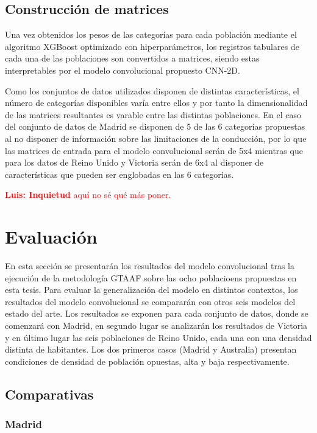 \documentclass{uathesis-es}
\begin{document}
{\subsection{Construcción de matrices}

Una vez obtenidos los pesos de las categorías para cada población mediante el algoritmo XGBoost optimizado con hiperparámetros, los registros tabulares de cada una de las poblaciones son convertidos a matrices, siendo estas interpretables por el modelo convolucional propuesto CNN-2D.

Como los conjuntos de datos utilizados disponen de distintas características, el número de categorías disponibles varía entre ellos y por tanto la dimensionalidad de las matrices resultantes es varable entre las distintas poblaciones. En el caso del conjunto de datos de Madrid se disponen de 5 de las 6 categorías propuestas al no disponer de información sobre las limitaciones de la conducción, por lo que las matrices de entrada para el modelo convolucional serán de 5x4 mientras que para los datos de Reino Unido y Victoria serán de 6x4 al disponer de características que pueden ser englobadas en las 6 categorías. 

\textcolor{red}{\textbf{Luis: Inquietud} aquí no sé qué más poner.}

\section{Evaluación}

En esta sección se presentarán los resultados del modelo convolucional tras la ejecución de la metodología GTAAF sobre las ocho poblacioens propuestas en esta tesis. Para evaluar la generalización del modelo en distintos contextos, los resultados del modelo convolucional se compararán con otros seis modelos del estado del arte. Los resultados se exponen para cada conjunto de datos, donde se comenzará con Madrid, en segundo lugar se analizarán los resultados de Victoria y en último lugar las seis poblaciones de Reino Unido, cada una con una densidad distinta de habitantes. Los dos primeros casos (Madrid y Australia) presentan condiciones de densidad de población opuestas, alta y baja respectivamente.

\subsection{Comparativas}
\subsubsection*{Madrid}

}
\end{document}
